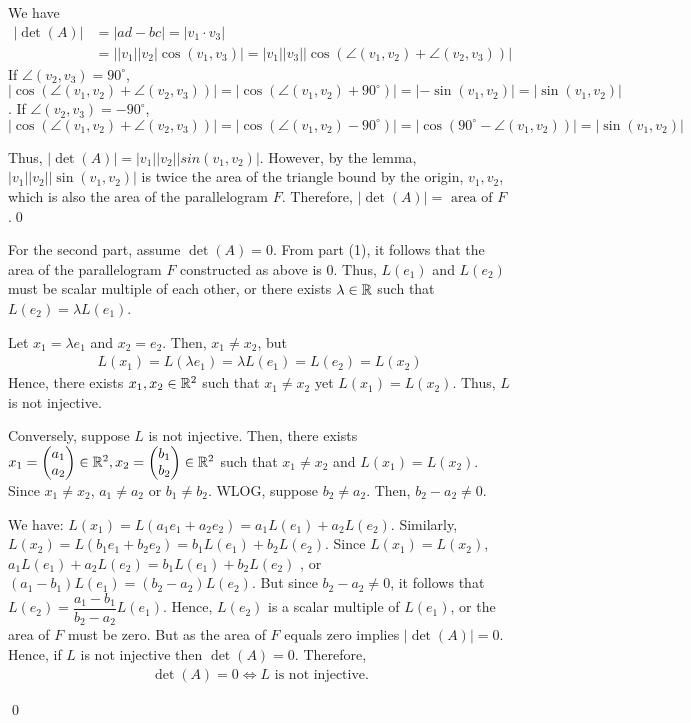 \begin{sol}
We have 
\[
    \begin{aligned}
        |\det(A)|&=|ad-bc|=|v_1\cdot v_3|\\&=||v_1||v_2|\cos(v_1,v_3)|=|v_1||v_3||\cos(\angle(v_1,v_2)+\angle(v_2,v_3))|
    \end{aligned}
\]
If $\angle(v_2,v_3)=90^{\circ}$, $|\cos(\angle(v_1,v_2)+\angle(v_2,v_3))|=|\cos(\angle(v_1,v_2)+90^{\circ})|=|-\sin(v_1,v_2)|=|\sin(v_1,v_2)|$.
If $\angle(v_2,v_3)=-90^{\circ}$, $|\cos(\angle(v_1,v_2)+\angle(v_2,v_3))|=|\cos(\angle(v_1,v_2)-90^{\circ})|=|\cos(90^{\circ}-\angle(v_1,v_2))|=|\sin(v_1,v_2)|$

Thus, $|\det(A)|=|v_1||v_2||sin(v_1,v_2)|$.
However, by the lemma, $|v_1||v_2||\sin(v_1,v_2)|$ is twice the area of the triangle bound by the origin, $v_1,v_2$, which is also the area of the parallelogram $F$.
Therefore, $|\det(A)|=\text{ area of }F$.\qed

For the second part, assume $\det(A)=0$.
From part (1), it follows that the area of the parallelogram $F$ constructed as above is 0.
Thus, $L(e_1)$ and $L(e_2)$ must be scalar multiple of each other, or there exists $\lambda\in\mathbb R$ such that $L(e_2)=\lambda L(e_1)$.

Let $x_1=\lambda e_1$ and $x_2=e_2$. Then, $x_1\not=x_2$, but 
\[
    \begin{aligned}
        L(x_1)=L(\lambda e_1)=\lambda L(e_1)=L(e_2)=L(x_2)
    \end{aligned}
\]
Hence, there exists $x_1,x_2\in\mathbb R^2$ such that $x_1\not=x_2$ yet $L(x_1)=L(x_2)$. Thus, $L$ is not injective.

Conversely, suppose $L$ is not injective.
Then, there exists $x_1=\begin{pmatrix} a_1\\ a_2\end{pmatrix}\in\mathbb R^2,x_2=\begin{pmatrix} b_1\\ b_2\end{pmatrix}\in\mathbb R^2$ such that $x_1\not=x_2$ and $L(x_1)=L(x_2)$.
Since $x_1\not=x_2$, $a_1\not=a_2$ or $b_1\not=b_2$.
WLOG, suppose $b_2\not=a_2$.
Then, $b_2-a_2\not=0$.

We have: $L(x_1)=L(a_1e_1+a_2e_2)=a_1L(e_1)+a_2L(e_2)$.
Similarly, $L(x_2)=L(b_1e_1+b_2e_2)=b_1L(e_1)+b_2L(e_2)$.
Since $L(x_1)=L(x_2)$, $a_1L(e_1)+a_2L(e_2)=b_1L(e_1)+b_2L(e_2)$
, or $(a_1-b_1)L(e_1)=(b_2-a_2)L(e_2)$.
But since $b_2-a_2\not=0$, it follows that $L(e_2)=\dfrac{a_1-b_1}{b_2-a_2}L(e_1)$.
Hence, $L(e_2)$ is a scalar multiple of $L(e_1)$, or the area of $F$ must be zero.
But as the area of $F$ equals zero implies $|\det(A)|=0$.
Hence, if $L$ is not injective then $\det(A)=0$.
Therefore, 
\[
    \begin{aligned}
        \det(A)=0\iff L\text{ is not injective.}
    \end{aligned}
\]
\end{sol}
\renewcommand{\qedsymbol}{$\blacksquare$}
\qed